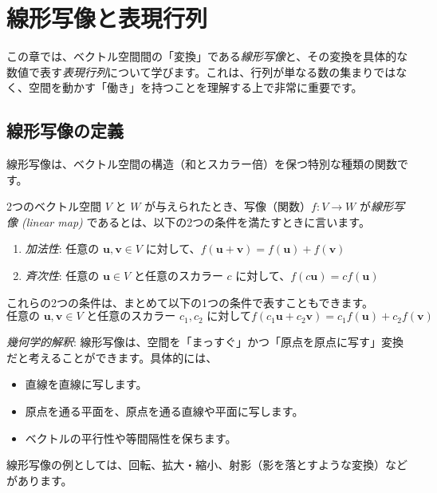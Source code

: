 \section{線形写像と表現行列}

この章では、ベクトル空間間の「変換」である\emph{線形写像}と、その変換を具体的な数値で表す\emph{表現行列}について学びます。これは、行列が単なる数の集まりではなく、空間を動かす「働き」を持つことを理解する上で非常に重要です。

\subsection{線形写像の定義}

線形写像は、ベクトル空間の構造（和とスカラー倍）を保つ特別な種類の関数です。

\begin{dfn}[線形写像]
2つのベクトル空間 $V$ と $W$ が与えられたとき、写像（関数）$f: V \to W$ が\emph{線形写像 (linear map)} であるとは、以下の2つの条件を満たすときに言います。
\begin{enumerate}
\item \emph{加法性}: 任意の $\bm{u}, \bm{v} \in V$ に対して、$f(\bm{u} + \bm{v}) = f(\bm{u}) + f(\bm{v})$
\item \emph{斉次性}: 任意の $\bm{u} \in V$ と任意のスカラー $c$ に対して、$f(c\bm{u}) = c f(\bm{u})$
\end{enumerate}
これらの2つの条件は、まとめて以下の1つの条件で表すこともできます。
\[\text{任意の $\bm{u}, \bm{v} \in V$ と任意のスカラー $c_1, c_2$ に対して}f(c_1\bm{u} + c_2\bm{v}) = c_1 f(\bm{u}) + c_2 f(\bm{v})\]
\end{dfn}

\emph{幾何学的解釈}:
線形写像は、空間を「まっすぐ」かつ「原点を原点に写す」変換だと考えることができます。具体的には、
\begin{itemize}
\item 直線を直線に写します。
\item 原点を通る平面を、原点を通る直線や平面に写します。
\item ベクトルの平行性や等間隔性を保ちます。
\end{itemize}

線形写像の例としては、回転、拡大・縮小、射影（影を落とすような変換）などがあります。

